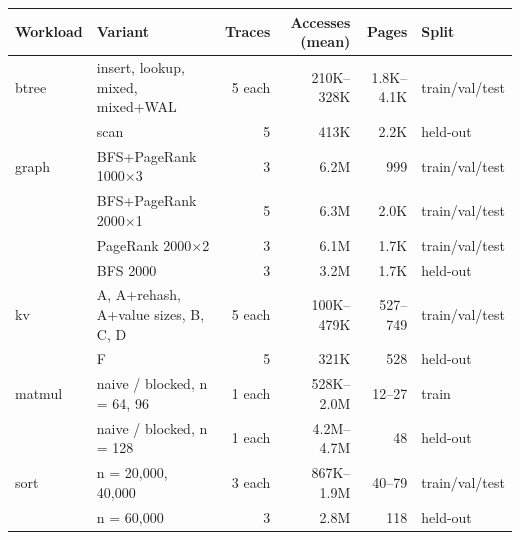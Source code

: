 \begin{tabular}{@{}llrrrl@{}}
\toprule
\textbf{Workload} & \textbf{Variant} & \textbf{Traces} & \textbf{Accesses (mean)} & \textbf{Pages} & \textbf{Split} \\
\midrule
btree & insert, lookup, mixed, mixed+WAL & 5 each & 210K--328K & 1.8K--4.1K & train/val/test \\
 & scan & 5 & 413K & 2.2K & held-out \\
\midrule
graph & BFS+PageRank 1000$\times$3 & 3 & 6.2M & 999 & train/val/test \\
 & BFS+PageRank 2000$\times$1 & 5 & 6.3M & 2.0K & train/val/test \\
 & PageRank 2000$\times$2 & 3 & 6.1M & 1.7K & train/val/test \\
 & BFS 2000 & 3 & 3.2M & 1.7K & held-out \\
\midrule
kv & A, A+rehash, A+value sizes, B, C, D & 5 each & 100K--479K & 527--749 & train/val/test \\
 & F & 5 & 321K & 528 & held-out \\
\midrule
matmul & naive / blocked, n = 64, 96 & 1 each & 528K--2.0M & 12--27 & train \\
 & naive / blocked, n = 128 & 1 each & 4.2M--4.7M & 48 & held-out \\
\midrule
sort & n = 20,000, 40,000 & 3 each & 867K--1.9M & 40--79 & train/val/test \\
 & n = 60,000 & 3 & 2.8M & 118 & held-out \\
\bottomrule
\end{tabular}
